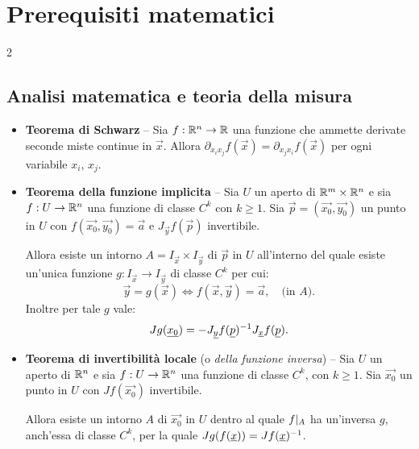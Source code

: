 \chapter*{Prerequisiti matematici}
\setlength{\parindent}{2pt}

\begin{multicols*}{2}

      \section*{Analisi matematica e teoria della misura}

      \begin{itemize}
            \item \textbf{Teorema di Schwarz} -- Sia $f : \mathbb{R}^n \to \mathbb{R}$ una funzione che ammette derivate seconde
                  miste continue in $\vec{x}$. Allora $\partial_{x_i x_j} f(\vec{x}) = \partial_{x_j x_i} f(\vec{x})$ per
                  ogni variabile $x_i$, $x_j$.

            \item \textbf{Teorema della funzione implicita} -- Sia $U$ un aperto di $\mathbb{R}^m \times \mathbb{R}^n$ e sia
                  $f : U \to \mathbb{R}^n$ una funzione di classe $C^k$ con $k \geq 1$. Sia $\vec{p} = (\vec{x_0}, \vec{y_0})$ un punto in $U$ con
                  $f(\vec{x_0}, \vec{y_0}) = \vec{a}$ e $J_{\vec{y}} f(\vec{p})$ invertibile. \smallskip

                  Allora esiste un
                  intorno $A = I_{\vec{x}} \times I_{\vec{y}}$  di $\vec{p}$ in $U$ all'interno del quale esiste un'unica
                  funzione $g : I_{\vec{x}} \to I_{\vec{y}}$ di classe $C^k$ per cui:
                  \[ \vec{y} = g(\vec{x}) \iff f(\vec{x}, \vec{y}) = \vec{a}, \quad \text{(in $A$)}. \]
                  Inoltre per tale $g$ vale:
                  \[ J g({\underline{x_0}}) = - J_{{\underline{y}}} f({\underline{p}})^{-1} J_{{\underline{x}}} f({\underline{p}}). \]

            \item \textbf{Teorema di invertibilità locale} (o \textit{della funzione inversa}) -- Sia $U$ un aperto di $\mathbb{R}^n$ e sia $f : U \to \mathbb{R}^n$ una
                  funzione di classe $C^k$, con $k \geq 1$. Sia $\vec{x_0}$ un punto in $U$ con $J f(\vec{x_0})$ invertibile. \smallskip

                  Allora esiste un
                  intorno $A$ di $\vec{x_0}$ in $U$ dentro al quale $f\arrowvert_{A}$ ha un'inversa $g$, anch'essa di classe
                  $C^k$, per la quale $J g(f({\underline{x}})) = J f({\underline{x}})^{-1}$.


\end{itemize}
\end{multicols*}
